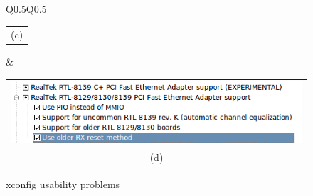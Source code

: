 \documentclass{chi2009}
\begin{document}
\begin{figure}[!t]
\begin{tabular}[textwidth]{Q{0.5\textwidth}Q{0.5\textwidth}}
\begin{tabular}{c}
  (c) \\
 \end{tabular}
  & 
\begin{tabular}{c}
  \includegraphics[scale=0.25,keepaspectratio=true]{figs/xconfigconfig} \\
  (d) \\
 \end{tabular}
\end{tabular}
\caption{\textsf{xconfig} usability problems}
\label{fig:xconfig}
\end{figure}
\end{document}
